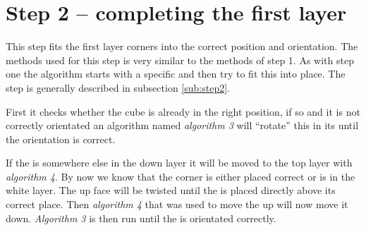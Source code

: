 \section{Step 2 -- completing the first layer}
This step fits the first layer corners into the correct position and orientation. The methods used for this step is very similar to the methods of step 1. 
As with step one the algorithm starts with a specific \cpiece{} and then try to fit this into place. 
The step is generally described in subsection \ref{sub:step2}.

First it checks whether the cube is already in the right position, if so and it is not correctly orientated an algorithm named \textit{algorithm 3} will ``rotate'' this \cpiece{} in its \cubicle{} until the orientation is correct. 

If the \cpiece{} is somewhere else in the down layer it will be moved to the top layer with \textit{algorithm 4}. 
By now we know that the corner \cpiece{} is either placed correct or is in the white layer. 
The up face will be twisted until the \cpiece{} is placed directly above its correct place. 
Then \textit{algorithm 4} that was used to move the \cpiece{} up will now move it down. 
\textit{Algorithm 3} is then run until the \cpiece{} is orientated correctly.

